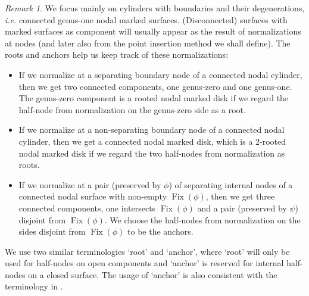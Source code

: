 \documentclass[11pt]{amsart}
\theoremstyle{definition}
\theoremstyle{remark}
\newtheorem{rmk}[dummy]{Remark}
\newcommand{\<}{\left<}
\renewcommand{\>}{\right>}
\numberwithin{equation}{section}
\begin{document}
\begin{rmk}\label{rmk root when degenerate}
We focus mainly on cylinders with boundaries and their degenerations, \textit{i.e.} connected genus-one nodal marked surfaces. (Disconnected) surfaces with marked surfaces as component will usually appear as the result of normalizations at nodes (and later also from the point insertion method we shall define). The roots and anchors help us keep track of these %
normalizations:
\begin{itemize}
    \item[-]  If %
we normalize at a separating boundary node of a connected nodal cylinder, then we get two %
connected components, one %
genus-zero and one genus-one. The genus-zero component is a rooted nodal marked disk if we regard the half-node from normalization on the genus-zero side as a root.
    \item[-] If we normalize at a non-separating boundary node of a connected nodal cylinder, then we get a connected nodal marked disk, which is a 2-rooted nodal marked disk if we regard the two half-nodes from normalization as roots.
    \item[-]  If we normalize at a pair (preserved by $\phi$) of separating internal nodes of a connected nodal surface with non-empty $\operatorname{Fix}(\phi)$, then we get three connected components, one intersects $\operatorname{Fix}(\phi)$ and a pair (preserved by $\psi$) disjoint from $\operatorname{Fix}(\phi)$. We choose the half-nodes from normalization on the sides disjoint from $\operatorname{Fix}(\phi)$ to be the anchors.
\end{itemize}
We use two %
similar terminologies `root' and `anchor', where `root' %
will only be used for half-nodes on open components and `anchor' is reserved for internal half-nodes on a closed surface. The usage of `anchor' is also consistent with the terminology in \cite{BCT1,BCT2,TZ1,TZ2}.

\end{rmk}
\end{document}
